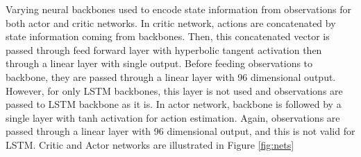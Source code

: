 \documentclass[a4paper, 12pt]{article} %
\begin{document}
Varying neural backbones used to encode state information from observations for both actor and critic networks. 
In critic network, actions are concatenated by state information coming from backbones. 
Then, this concatenated vector is passed through feed forward layer with hyperbolic tangent activation then through a linear layer with single output. 
Before feeding observations to backbone, they are passed through a linear layer with 96 dimensional output. 
However, for only LSTM backbones, this layer is not used and observations are passed to LSTM backbone as it is. 
In actor network, backbone is followed by a single layer with tanh activation for action estimation. 
Again, observations are passed through a linear layer with 96 dimensional output, and this is not valid for LSTM.
Critic and Actor networks are illustrated in Figure \ref{fig:nets} 
\end{document}
